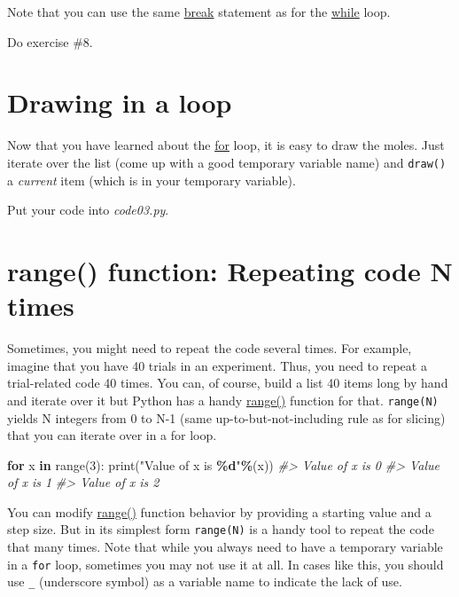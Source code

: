 \documentclass[
]{book}
\newenvironment{Shaded}{\begin{snugshade}}{\end{snugshade}}
\newcommand{\BuiltInTok}[1]{#1}
\newcommand{\CommentTok}[1]{\textcolor[rgb]{0.56,0.35,0.01}{\textit{#1}}}
\newcommand{\ControlFlowTok}[1]{\textcolor[rgb]{0.13,0.29,0.53}{\textbf{#1}}}
\newcommand{\DecValTok}[1]{\textcolor[rgb]{0.00,0.00,0.81}{#1}}
\newcommand{\KeywordTok}[1]{\textcolor[rgb]{0.13,0.29,0.53}{\textbf{#1}}}
\newcommand{\NormalTok}[1]{#1}
\newcommand{\OperatorTok}[1]{\textcolor[rgb]{0.81,0.36,0.00}{\textbf{#1}}}
\newcommand{\SpecialCharTok}[1]{\textcolor[rgb]{0.81,0.36,0.00}{\textbf{#1}}}
\newcommand{\StringTok}[1]{\textcolor[rgb]{0.31,0.60,0.02}{#1}}
\begin{document}
Note that you can use the same \href{https://docs.python.org/3/tutorial/controlflow.html?highlight=loop\#break-and-continue-statements-and-else-clauses-on-loops}{break} statement as for the \href{https://docs.python.org/3/reference/compound_stmts.html\#the-while-statement}{while} loop.

Do exercise \#8.

\hypertarget{drawing-in-a-loop}{%
\section{Drawing in a loop}\label{drawing-in-a-loop}}

Now that you have learned about the \protect\hyperlink{for-loop}{for} loop, it is easy to draw the moles. Just iterate over the list (come up with a good temporary variable name) and \texttt{draw()} a \emph{current} item (which is in your temporary variable).

Put your code into \emph{code03.py}.

\hypertarget{range}{%
\section{range() function: Repeating code N times}\label{range}}

Sometimes, you might need to repeat the code several times. For example, imagine that you have 40 trials in an experiment. Thus, you need to repeat a trial-related code 40 times. You can, of course, build a list 40 items long by hand and iterate over it but Python has a handy \href{https://docs.python.org/3/tutorial/controlflow.html?highlight=loop\#the-range-function}{range()} function for that. \texttt{range(N)} yields N integers from 0 to N-1 (same up-to-but-not-including rule as for slicing) that you can iterate over in a for loop.

\begin{Shaded}
\begin{Highlighting}[]
\ControlFlowTok{for}\NormalTok{ x }\KeywordTok{in} \BuiltInTok{range}\NormalTok{(}\DecValTok{3}\NormalTok{):}
    \BuiltInTok{print}\NormalTok{(}\StringTok{"Value of x is }\SpecialCharTok{\%d}\StringTok{"}\OperatorTok{\%}\NormalTok{(x))}
\CommentTok{\#\textgreater{} Value of x is 0}
\CommentTok{\#\textgreater{} Value of x is 1}
\CommentTok{\#\textgreater{} Value of x is 2}
\end{Highlighting}
\end{Shaded}

You can modify \href{https://docs.python.org/3/library/stdtypes.html\#range}{range()} function behavior by providing a starting value and a step size. But in its simplest form \texttt{range(N)} is a handy tool to repeat the code that many times. Note that while you always need to have a temporary variable in a \texttt{for} loop, sometimes you may not use it at all. In cases like this, you should use \texttt{\_} (underscore symbol) as a variable name to indicate the lack of use.
\end{document}
